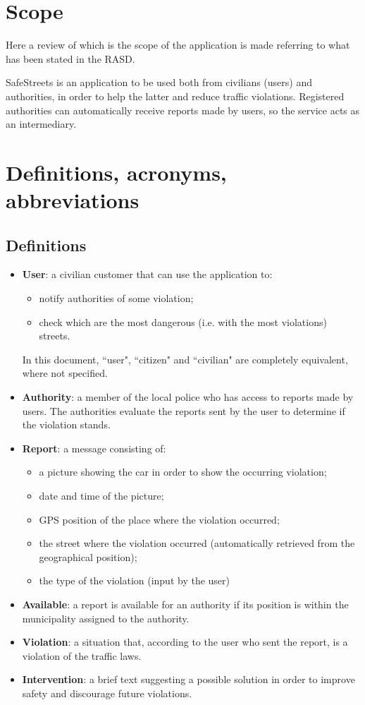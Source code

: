 \documentclass[12pt,a4paper]{report}
\begin{document}
		\section{Scope}
			Here a review of which is the scope of the application is made referring to what	has been stated in the RASD.


			SafeStreets is an application to be used both from civilians (users) and authorities, in order to help the latter and
			reduce traffic violations. Registered authorities can automatically receive reports made by users, so the service acts
			as an intermediary. 

		\section{Definitions, acronyms, abbreviations}
			\subsection{Definitions}
				\begin{itemize}
				\item \textbf{User}: a civilian customer that can use the application to:
					\begin{itemize}
					\item notify authorities of some violation;
					\item check which are the most dangerous (i.e. with the most violations) streets.
					\end{itemize}
				In this document, ``user", ``citizen" and ``civilian" are completely equivalent, where not specified.
				\item \textbf{Authority}: a member of the local police who has access to reports made by users. The
					authorities evaluate the reports sent by the user to determine if the violation stands.
				\item \textbf{Report}: a message consisting of:
					\begin{itemize}
					\item a picture showing the car in order to show the occurring violation;
					\item date and time of the picture;
					\item GPS position of the place where the violation occurred;
					\item the street where the violation occurred (automatically retrieved from the geographical position);
					\item the type of the violation (input by the user)
					\end{itemize}
				\item \textbf{Available}: a report is available for an authority if its position is within the municipality assigned
					to the authority.
				\item \textbf{Violation}: a situation that, according to the user who sent the report, is a violation of the
					traffic laws.
				\item \textbf{Intervention}: a brief text suggesting a possible solution in order to improve safety and
					discourage future violations.
				\end{itemize}
\end{document}
